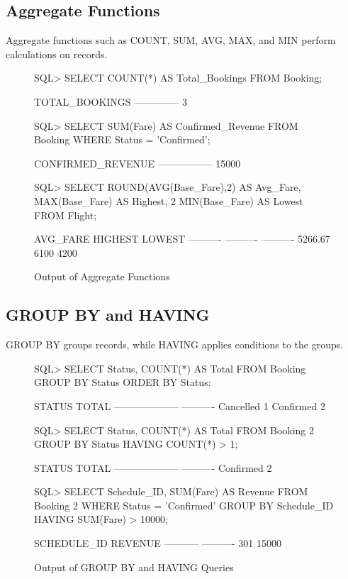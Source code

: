 \documentclass[12pt,a4paper]{article}
\begin{document}
\subsection{Aggregate Functions}
Aggregate functions such as COUNT, SUM, AVG, MAX, and MIN perform calculations on records.
\begin{figure}[H]
\begin{terminal}
SQL> SELECT COUNT(*) AS Total_Bookings FROM Booking;

TOTAL_BOOKINGS
--------------
             3

SQL> SELECT SUM(Fare) AS Confirmed_Revenue FROM Booking WHERE Status = 'Confirmed';

CONFIRMED_REVENUE
-----------------
            15000

SQL> SELECT ROUND(AVG(Base_Fare),2) AS Avg_Fare, MAX(Base_Fare) AS Highest,
  2         MIN(Base_Fare) AS Lowest FROM Flight;

  AVG_FARE    HIGHEST     LOWEST
---------- ---------- ----------
   5266.67       6100       4200
\end{terminal}
\caption{Output of Aggregate Functions}
\end{figure}

\subsection{GROUP BY and HAVING}
GROUP BY groups records, while HAVING applies conditions to the groups.
\begin{figure}[H]
\begin{terminal}
SQL> SELECT Status, COUNT(*) AS Total FROM Booking GROUP BY Status ORDER BY Status;

STATUS                   TOTAL
-------------------- ----------
Cancelled                     1
Confirmed                     2

SQL> SELECT Status, COUNT(*) AS Total FROM Booking
  2  GROUP BY Status HAVING COUNT(*) > 1;

STATUS                   TOTAL
-------------------- ----------
Confirmed                     2

SQL> SELECT Schedule_ID, SUM(Fare) AS Revenue FROM Booking
  2  WHERE Status = 'Confirmed' GROUP BY Schedule_ID HAVING SUM(Fare) > 10000;

SCHEDULE_ID    REVENUE
----------- ----------
        301      15000
\end{terminal}
\caption{Output of GROUP BY and HAVING Queries}
\end{figure}
\end{document}
